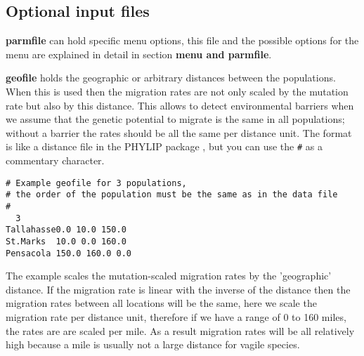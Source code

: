 \subsection{Optional input files}
\begin{description}
\item{\bf parmfile} can hold specific menu options, this file and the possible options for the menu are explained in detail in section {\bf menu and parmfile}.
\item{\bf geofile} holds the geographic or arbitrary distances between the populations. When this is used then the migration rates are not only scaled by the mutation rate but also by this distance. This allows to detect environmental barriers when we assume that the genetic potential to migrate is the same in all populations; without a barrier the rates should be all the same per distance unit. The format is like a distance file in the PHYLIP package \citep{Felsenstein}, but you can use the {\tt \#} as a commentary character.\\
\begin{small}
\begin{verbatim}
# Example geofile for 3 populations, 
# the order of the population must be the same as in the data file
# 
  3
Tallahasse0.0 10.0 150.0
St.Marks  10.0 0.0 160.0
Pensacola 150.0 160.0 0.0
\end{verbatim}
\end{small}
The example scales the mutation-scaled migration rates by the 'geographic' distance. If the migration rate is linear with the inverse of the distance then the migration rates between all locations will be the same, here we scale the migration rate per distance unit, therefore if we have a range of 0 to 160 miles, the rates are are scaled per mile. As a result migration rates will be all relatively high because a mile is usually not a large distance for vagile species. 


\end{description}
